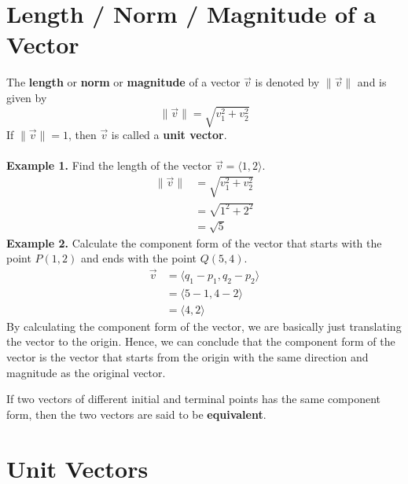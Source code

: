 \documentclass{report}
\begin{document}
\section*{Length / Norm / Magnitude of a Vector}

The \textbf{length} or \textbf{norm} or \textbf{magnitude} of a vector
$\vec{v}$ is denoted by $\lVert \vec{v} \rVert$ and is given by \[\lVert \vec{v} \rVert = \sqrt{v_1^2 + v_2^2}\]
If $\lVert \vec{v} \rVert = 1$, then $\vec{v}$ is called a \textbf{unit
    vector}.\\\\ \noindent\textbf{Example 1. } Find the length of the vector
$\vec{v} = \langle 1, 2 \rangle$.
\begin{align*}
    \lVert \vec{v} \rVert & = \sqrt{v_1^2 + v_2^2} \\
                          & = \sqrt{1^2 + 2^2}     \\
                          & = \sqrt{5}
\end{align*}
\noindent\textbf{Example 2. } Calculate the component form of the vector that starts with the point $P(1, 2)$ and ends with the point $Q(5, 4)$.
\begin{align*}
    \vec{v} & = \langle q_1 - p_1, q_2 - p_2 \rangle \\
            & = \langle 5 - 1, 4 - 2 \rangle         \\
            & = \langle 4, 2 \rangle
\end{align*}
By calculating the component form of the vector, we are basically just translating the vector to the origin. Hence, we can conclude that the component form of the vector is the vector that starts from the origin with the same direction and magnitude as the original vector.

If two vectors of different initial and terminal points has the same component
form, then the two vectors are said to be \textbf{equivalent}.

\section*{Unit Vectors}
\end{document}
